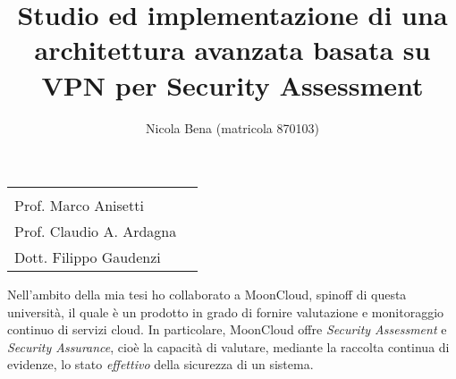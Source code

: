 \documentclass[10pt,a4paper]{article}
\begin{document}
        \title{\textbf{Studio ed implementazione di una architettura avanzata
        basata su VPN per Security Assessment}}
        \author{Nicola Bena (matricola 870103)}
        \date{}

        \maketitle

        \vspace{0.5cm}

        \begin{minipage}{\linewidth}
            \begin{tabular}{l r}
                \begin{minipage}[t]{.4\linewidth}
                    \begin{flushleft}
                        {%
                            RELATORE\\[.15cm]
                            Prof. Marco Anisetti
                        }
                    \end{flushleft}
                \end{minipage}
                &
                \begin{minipage}[t]{.53\linewidth}
                    \begin{flushright}
                        {%
                            CORRELATORI\\[.15cm]
                            Prof. Claudio A. Ardagna\\[.1cm]
                            Dott. Filippo Gaudenzi
                        }
                    \end{flushright}
                \end{minipage}
            \end{tabular}
        \end{minipage}

        \vspace{2cm}

        Nell'ambito della mia tesi ho collaborato a MoonCloud, spinoff di questa università,
        il quale è un prodotto in grado di fornire valutazione e monitoraggio continuo
        di servizi cloud. In particolare, MoonCloud offre \textit{Security Assessment} e
        \textit{Security Assurance}, cioè la capacità di valutare, mediante
        la raccolta continua di evidenze, lo stato \textit{effettivo} della sicurezza
        di un sistema.
\end{document}
